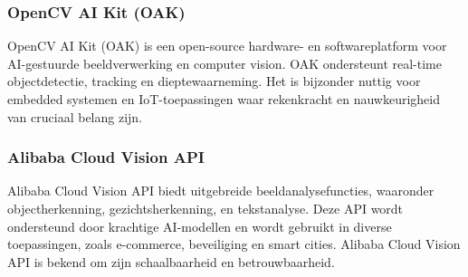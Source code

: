 \subsubsection{OpenCV AI Kit (OAK)}
OpenCV AI Kit (OAK) is een open-source hardware- en softwareplatform voor AI-gestuurde beeldverwerking en computer vision. OAK ondersteunt real-time objectdetectie, tracking en dieptewaarneming. Het is bijzonder nuttig voor embedded systemen en IoT-toepassingen waar rekenkracht en nauwkeurigheid van cruciaal belang zijn\autocite{opencv}.

\subsubsection{Alibaba Cloud Vision API}
Alibaba Cloud Vision API biedt uitgebreide beeldanalysefuncties, waaronder objectherkenning, gezichtsherkenning, en tekstanalyse. Deze API wordt ondersteund door krachtige AI-modellen en wordt gebruikt in diverse toepassingen, zoals e-commerce, beveiliging en smart cities. Alibaba Cloud Vision API is bekend om zijn schaalbaarheid en betrouwbaarheid\autocite{alibaba}.





